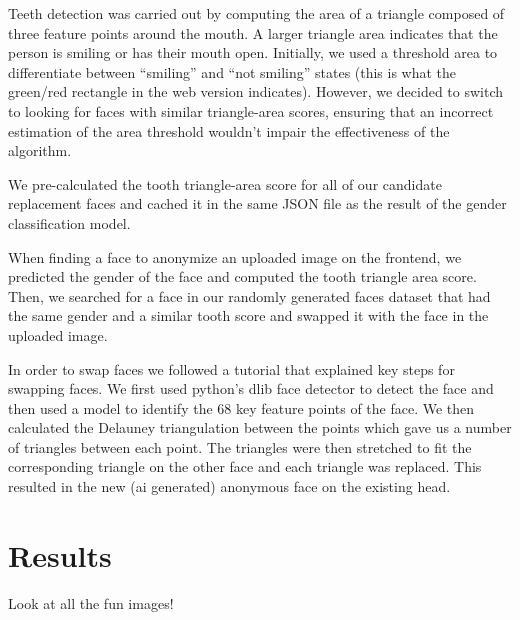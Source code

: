 Teeth detection was carried out by computing the area of a triangle composed of three feature points around the mouth. A larger triangle area indicates that the person is smiling or has their mouth open. Initially, we used a threshold area to differentiate between ``smiling'' and ``not smiling'' states (this is what the green/red rectangle in the web version indicates). However, we decided to switch to looking for faces with similar triangle-area scores, ensuring that an incorrect estimation of the area threshold wouldn't impair the effectiveness of the algorithm.

We pre-calculated the tooth triangle-area score for all of our candidate replacement faces and cached it in the same JSON file as the result of the gender classification model.

When finding a face to anonymize an uploaded image on the frontend, we predicted the gender of the face and computed the tooth triangle area score. Then, we searched for a face in our randomly generated faces dataset that had the same gender and a similar tooth score and swapped it with the face in the uploaded image.

In order to swap faces we followed a tutorial \cite{there_2019} that explained key steps for swapping faces. We first used python's dlib face detector to detect the face and then used a model to identify the 68 key feature points of the face. We then calculated the Delauney triangulation between the points which gave us a number of triangles between each point. The triangles were then stretched to fit the corresponding triangle on the other face and each triangle was replaced. This resulted in the new (ai generated) anonymous face on the existing head.

\section{Results}

Look at all the fun images!




